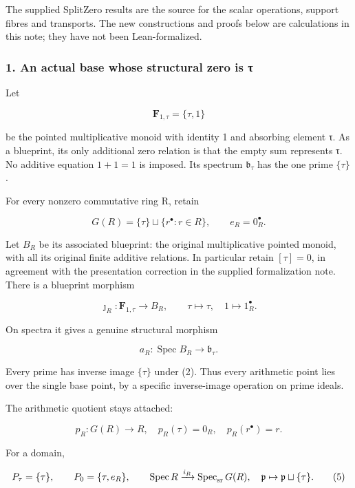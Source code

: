 The supplied SplitZero results are the source for the scalar operations, support fibres and transports. The new constructions and proofs below are calculations in this note; they have not been Lean-formalized.

\subsubsection{1. An actual base whose structural zero is τ}\label{endpoint-tau_base--an-actual-base-whose-structural-zero-is-ux3c4}

Let

\[
\mathbf F_{1,\tau}=\{\tau,1\}
\]

be the pointed multiplicative monoid with identity 1 and absorbing element τ. As a blueprint, its only additional zero relation is that the empty sum represents τ. No additive equation \(1+1=1\) is imposed. Its spectrum \(\mathfrak b_\tau\) has the one prime \(\{\tau\}\).

For every nonzero commutative ring R, retain

\[
G(R)=\{\tau\}\sqcup\{r^\bullet:r\in R\},\qquad e_R=0_R^\bullet.
\tag{1}
\]

Let \(B_R\) be its associated blueprint: the original multiplicative pointed monoid, with all its original finite additive relations. In particular retain \([\tau]=0\), in agreement with the presentation correction in the supplied formalization note. There is a blueprint morphism

\[
\jmath_R:\mathbf F_{1,\tau}\longrightarrow B_R,
\qquad \tau\mapsto\tau,\quad1\mapsto1_R^\bullet.
\tag{2}
\]

On spectra it gives a genuine structural morphism

\[
a_R:\operatorname{Spec}B_R\longrightarrow\mathfrak b_\tau.
\tag{3}
\]

Every prime has inverse image \(\{\tau\}\) under (2). Thus every arithmetic point lies over the single base point, by a specific inverse-image operation on prime ideals.

The arithmetic quotient stays attached:

\[
p_R:G(R)\longrightarrow R,
\quad p_R(\tau)=0_R,\quad p_R(r^\bullet)=r.
\tag{4}
\]

For a domain,

\[
P_\tau=\{\tau\},\qquad P_0=\{\tau,e_R\},\qquad
\operatorname{Spec}R\xrightarrow{i_R}\operatorname{Spec}_{\rm sr}G(R),
\quad\mathfrak p\mapsto\mathfrak p\sqcup\{\tau\}.
\tag{5}
\]

